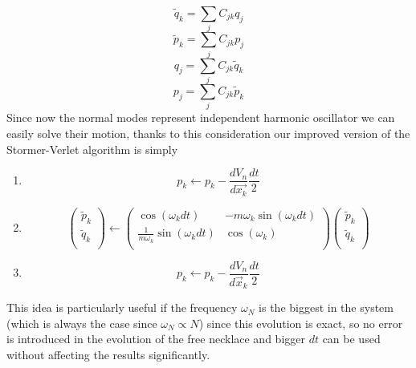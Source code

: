 \documentclass[10pt,a4paper]{article}
\begin{document}
\[\tilde{q}_k = \sum_j C_{jk}q_j  \]
\[\tilde{p}_k = \sum_j C_{jk}p_j  \]
\[q_j = \sum_j C_{jk}\tilde{q}_k  \]
\[p_j = \sum_j C_{jk}\tilde{p}_k  \]
Since now the normal modes represent independent harmonic oscillator we can easily solve their motion, thanks to this consideration our improved version of the Stormer-Verlet algorithm is simply
\begin{enumerate}
	\item \[p_k \leftarrow p_k - \frac{dV_n}{d\vec{x_k}}\frac{dt}{2}\]
	\item 
	\begin{equation}
		\begin{pmatrix} 
	\tilde{p}_k  \\
	\tilde{q}_k \\
	\end{pmatrix} 
	\leftarrow
	\begin{pmatrix} 
	\cos(\omega_k dt) & -m\omega_k \sin(\omega_k dt)   \\
	\frac{1}{m\omega_k}\sin(\omega_k dt) & \cos(\omega_k)  \\
	\end{pmatrix} 
	\begin{pmatrix} 
	\tilde{p}_k  \\
	\tilde{q}_k \\
	\end{pmatrix} 
	\end{equation}
	\item \[ p_k \leftarrow p_k - \frac{dV_n}{d\vec{x}_k}\frac{dt}{2}\]
\end{enumerate}
This idea is particularly useful if the frequency $\omega_N$ is the biggest in the system (which is always the case since $\omega_N \propto N$) since this evolution is exact, so no error is introduced in the evolution of the free necklace and bigger $dt$ can be used without affecting the results significantly.
\end{document}
